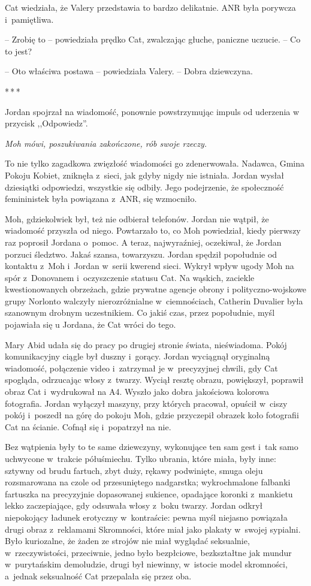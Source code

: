 \documentclass[oneside,polish,11pt,sfheadings]{mwbk}
\newcommand{\threeast}{\bigskip\par\centerline{*\,*\,*}\medskip\par}%
\begin{document}
Cat wiedziała, że Valery przedstawia to bardzo delikatnie. ANR była
porywcza i~pamiętliwa.

-- Zrobię to -- powiedziała prędko Cat, zwalczając głuche, paniczne
uczucie. -- Co to jest?

-- Oto właściwa postawa -- powiedziała Valery. -- Dobra dziewczyna.
  \threeast 

Jordan spojrzał na wiadomość, ponownie powstrzymując impuls od uderzenia
w przycisk ,,Odpowiedz''.

\emph{Moh mówi, poszukiwania zakończone, rób swoje rzeczy.}

To nie tylko zagadkowa zwięzłość wiadomości go zdenerwowała. Nadawca,
Gmina Pokoju Kobiet, zniknęła z~sieci, jak gdyby nigdy nie istniała.
Jordan wysłał dziesiątki odpowiedzi, wszystkie się odbiły. Jego
podejrzenie, że społeczność femininistek była powiązana z~ANR, się
wzmocniło.

Moh, gdziekolwiek był, też nie odbierał telefonów. Jordan nie wątpił, że
wiadomość przyszła od niego. Powtarzało to, co Moh powiedział, kiedy
pierwszy raz poprosił Jordana o~pomoc. A teraz, najwyraźniej, oczekiwał,
że Jordan porzuci śledztwo. Jakaś szansa, towarzyszu. Jordan spędził
popołudnie od kontaktu z~Moh i~Jordan w~serii kwerend sieci. Wykrył
wpływ ugody Moh na spór z~Donovanem i~oczyszczenie statusu Cat. Na
wąskich, zaciekle kwestionowanych obrzeżach, gdzie prywatne agencje obrony
i polityczno-wojskowe grupy Norlonto walczyły nierozróżnialne w~ciemnościach, Catherin Duvalier była szanownym drobnym uczestnikiem. Co
jakiś czas, przez popołudnie, myśl pojawiała się u Jordana, że Cat wróci
do tego.

Mary Abid udała się do pracy po drugiej stronie świata, nieświadoma.
Pokój komunikacyjny ciągle był duszny i~gorący. Jordan wyciągnął
oryginalną wiadomość, połączenie video i~zatrzymał je w~precyzyjnej
chwili, gdy Cat spogląda, odrzucając włosy z~twarzy. Wyciął resztę
obrazu, powiększył, poprawił obraz Cat i~wydrukował na A4. Wyszło jako
dobra jakościowa kolorowa fotografia. Jordan wyłączył maszyny, przy
których pracował, opuścił w~ciszy pokój i~poszedł na górę do pokoju Moh,
gdzie przyczepił obrazek koło fotografii Cat na ścianie. Cofnął się i~popatrzył na nie.

Bez wątpienia były to te same dziewczyny, wykonujące ten sam gest i~tak
samo uchwycone w~trakcie półuśmiechu. Tylko ubrania, które miała, były
inne: sztywny od brudu fartuch, zbyt duży, rękawy podwinięte, smuga
oleju rozsmarowana na czole od przesuniętego nadgarstka; wykrochmalone
falbanki fartuszka na precyzyjnie dopasowanej sukience, opadające
koronki z~mankietu lekko zaczepiające, gdy odsuwała włosy z~boku twarzy.
Jordan odkrył niepokojący ładunek erotyczny w~kontraście: pewna myśl
niejasno powiązała drugi obraz z~reklamami Skromności, które miał jako
plakaty w~swojej sypialni. Było kuriozalne, że żaden ze strojów nie miał
wyglądać seksualnie, w~rzeczywistości, przeciwnie, jedno było
bezpłciowe, bezkształtne jak mundur w~purytańskim demoludzie, drugi był
niewinny, w~istocie model skromności, a~jednak seksualność Cat
przepalała się przez oba.
\end{document}
